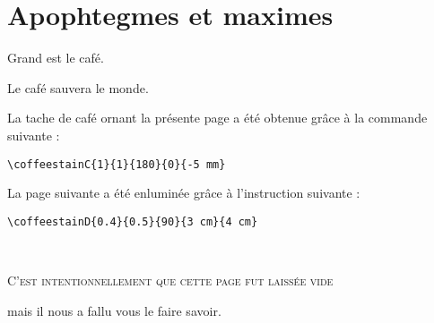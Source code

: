 \documentclass[a4paper, 11pt, BCOR = 0 pt, DIV = 13, oneside]{scrartcl}
\begin{document}
\section{Apophtegmes et maximes}
\noindent
Grand est le café.

\vspace{5mm}

\noindent
Le café sauvera le monde.

\vfill{}

\begin{tcolorbox}
  La tache de café ornant la présente page a été obtenue grâce à la commande suivante :

  \verb|\coffeestainC{1}{1}{180}{0}{-5 mm}|
\end{tcolorbox}

\begin{tcolorbox}
La page suivante a été enluminée grâce à l'instruction suivante :

  \verb|\coffeestainD{0.4}{0.5}{90}{3 cm}{4 cm}|
\end{tcolorbox}

\newpage{}
\pagestyle{empty}
~\\

\label{stainD}

\vfill{}
\begin{center}
\textsc{C'est intentionnellement que cette page fut laissée vide}

mais il nous a fallu vous le faire savoir.
\end{center}

\vfill{}
\end{document}

